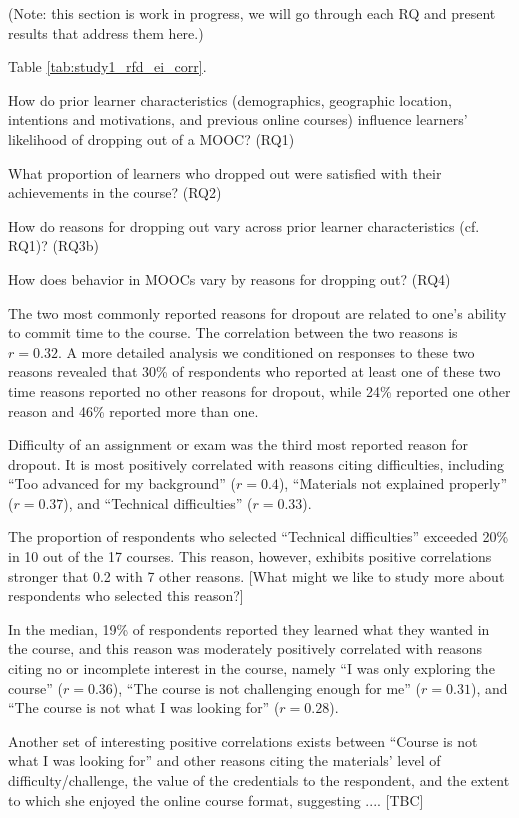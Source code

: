 \documentclass{sigchi}\usepackage[]{graphicx}\usepackage[]{color}
\begin{document}
(Note: this section is work in progress, we will go through each RQ and present results that address them here.)

Table \ref{tab:study1_rfd_ei_corr}.

How do prior learner characteristics (demographics, geographic location, intentions and motivations, and previous online courses) influence learners' likelihood of dropping out of a MOOC? (RQ1)

What proportion of learners who dropped out were satisfied with their achievements in the course? (RQ2)



 How do reasons for dropping out vary across prior learner characteristics (cf. RQ1)? (RQ3b)
 
How does behavior in MOOCs vary by reasons for dropping out? (RQ4)

The two most commonly reported reasons for dropout are related to one's ability to commit time to the course. The correlation between the two reasons is $r=0.32$. A more detailed analysis we conditioned on responses to these two reasons revealed that 30\% of respondents who reported at least one of these two time reasons reported no other reasons for dropout, while 24\% reported one other reason and 46\% reported more than one.

Difficulty of an assignment or exam was the third most reported reason for dropout. It is most positively correlated with reasons citing difficulties, including ``Too advanced for my background'' ($r=0.4$), ``Materials not explained properly'' ($r=0.37$), and ``Technical difficulties'' ($r=0.33$).

The proportion of respondents who selected ``Technical difficulties'' exceeded 20\% in 10 out of the 17 courses. This reason, however, exhibits positive correlations stronger that 0.2 with 7 other reasons. [What might we like to study more about respondents who selected this reason?]

In the median, 19\% of respondents reported they learned what they wanted in the course, and this reason was moderately positively correlated with reasons citing no or incomplete interest in the course, namely ``I was only exploring the course'' ($r=0.36$), ``The course is not challenging enough for me'' ($r=0.31$), and ``The course is not what I was looking for'' ($r=0.28$).

Another set of interesting positive correlations exists between ``Course is not what I was looking for'' and other reasons citing the materials' level of difficulty/challenge, the value of the credentials to the respondent, and the extent to which she enjoyed the online course format, suggesting .... [TBC]
\end{document}
